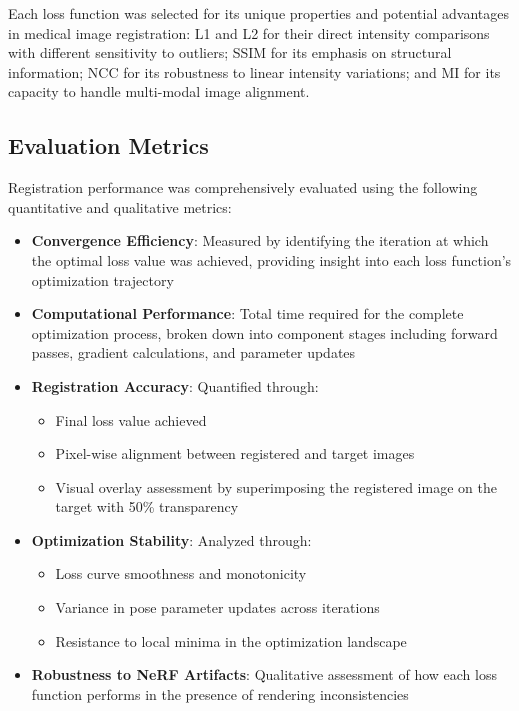 Each loss function was selected for its unique properties and potential advantages in medical image registration: L1 and L2 for their direct intensity comparisons with different sensitivity to outliers; SSIM for its emphasis on structural information; NCC for its robustness to linear intensity variations; and MI for its capacity to handle multi-modal image alignment.

\subsection{Evaluation Metrics}

Registration performance was comprehensively evaluated using the following quantitative and qualitative metrics:

\begin{itemize}
    \item \textbf{Convergence Efficiency}: Measured by identifying the iteration at which the optimal loss value was achieved, providing insight into each loss function's optimization trajectory
    
    \item \textbf{Computational Performance}: Total time required for the complete optimization process, broken down into component stages including forward passes, gradient calculations, and parameter updates
    
    \item \textbf{Registration Accuracy}: Quantified through:
    \begin{itemize}
        \item Final loss value achieved
        \item Pixel-wise alignment between registered and target images
        \item Visual overlay assessment by superimposing the registered image on the target with 50\% transparency
    \end{itemize}
    
    \item \textbf{Optimization Stability}: Analyzed through:
    \begin{itemize}
        \item Loss curve smoothness and monotonicity
        \item Variance in pose parameter updates across iterations
        \item Resistance to local minima in the optimization landscape
    \end{itemize}
    
    \item \textbf{Robustness to NeRF Artifacts}: Qualitative assessment of how each loss function performs in the presence of rendering inconsistencies
\end{itemize}


